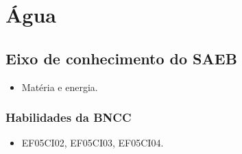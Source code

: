 \chapter{Água}

\vspace*{-1.5cm}
\enlargethispage{4\baselineskip}

\section*{Eixo de conhecimento do SAEB}
\begin{itemize}
	\item Matéria e energia.
\end{itemize}

\subsection{Habilidades da BNCC}

\begin{itemize}
\item EF05CI02, EF05CI03, EF05CI04.
\end{itemize}

